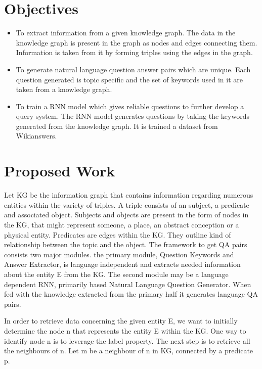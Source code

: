 \documentclass[conference]{IEEEtran}
\begin{document}
\section{Objectives}
\begin{itemize}
\item To extract information from a given knowledge graph. The data in the knowledge graph is present in the graph as nodes and edges connecting them. Information is taken from it by forming triples using the edges in the graph.
\item To generate natural language question answer pairs which are unique. Each question generated is topic specific and the set of keywords used in it are taken from a knowledge graph.

\item To train a RNN model which gives reliable questions to further develop a query system. The RNN model generates questions by taking the keywords generated from the knowledge graph. It is trained a dataset from Wikianswers.
\end{itemize}

\section{Proposed Work}
Let KG be the information graph that contains information regarding numerous entities within the variety of
triples. A triple consists of an subject, a predicate and associated object. Subjects and objects are present in the form of nodes in the KG, that might represent someone, a place, an abstract conception or a physical entity. Predicates are edges within the KG. They outline kind of relationship between the topic and the object. The framework to get QA pairs consists two major modules. the primary module, Question
Keywords and Answer Extractor, is language independent and extracts needed information about the entity E from the KG. The second module may be a language dependent RNN, primarily based Natural Language Question Generator. When fed with the knowledge extracted from the primary half it generates language QA pairs.

In order to retrieve data concerning the given entity E, we want to initially determine the node n that
represents the entity E within the KG. One way to identify node n is to leverage the label property.
The next step is to retrieve all the neighbours of n. Let m be a neighbour of n in KG, connected
by a predicate p. 
\end{document}
